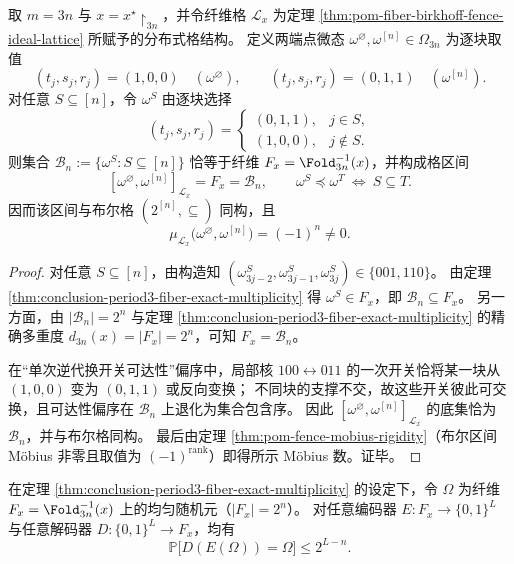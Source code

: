 \begin{proposition}\label{prop:conclusion-periodic-fiber-boolean-interval-mobius}
取 \(m=3n\) 与 \(x=x^\star\!\upharpoonright_{3n}\)，并令纤维格 \(\mathcal L_x\) 为定理 \ref{thm:pom-fiber-birkhoff-fence-ideal-lattice} 所赋予的分布式格结构。
定义两端点微态 \(\omega^{\varnothing},\omega^{[n]}\in\Omega_{3n}\) 为逐块取值
\[
(t_j,s_j,r_j)=(1,0,0)\quad(\omega^{\varnothing}),
\qquad
(t_j,s_j,r_j)=(0,1,1)\quad(\omega^{[n]}).
\]
对任意 \(S\subseteq[n]\)，令 \(\omega^{S}\) 由逐块选择
\[
(t_j,s_j,r_j)=
\begin{cases}
(0,1,1),& j\in S,\\
(1,0,0),& j\notin S.
\end{cases}
\]
则集合
\(
\mathcal B_n:=\{\omega^{S}:S\subseteq[n]\}
\)
恰等于纤维 \(F_x=\Fold_{3n}^{-1}(x)\)，并构成格区间
\[
[\omega^{\varnothing},\omega^{[n]}]_{\mathcal L_x}=F_x=\mathcal B_n,
\qquad
\omega^{S}\preceq \omega^{T}\ \Longleftrightarrow\ S\subseteq T.
\]
因而该区间与布尔格 \((2^{[n]},\subseteq)\) 同构，且
\[
\mu_{\mathcal L_x}\!\bigl(\omega^{\varnothing},\omega^{[n]}\bigr)=(-1)^n\neq 0.
\]
\end{proposition}

\begin{proof}
对任意 \(S\subseteq[n]\)，由构造知 \((\omega^S_{3j-2},\omega^S_{3j-1},\omega^S_{3j})\in\{001,110\}\)。
由定理 \ref{thm:conclusion-period3-fiber-exact-multiplicity} 得 \(\omega^S\in F_x\)，即 \(\mathcal B_n\subseteq F_x\)。
另一方面，由 \(|\mathcal B_n|=2^n\) 与定理 \ref{thm:conclusion-period3-fiber-exact-multiplicity} 的精确多重度 \(d_{3n}(x)=|F_x|=2^n\)，可知 \(F_x=\mathcal B_n\)。

在“单次逆代换开关可达性”偏序中，局部核 \(100\leftrightarrow 011\) 的一次开关恰将某一块从 \((1,0,0)\) 变为 \((0,1,1)\) 或反向变换；
不同块的支撑不交，故这些开关彼此可交换，且可达性偏序在 \(\mathcal B_n\) 上退化为集合包含序。
因此 \([\omega^{\varnothing},\omega^{[n]}]_{\mathcal L_x}\) 的底集恰为 \(\mathcal B_n\)，并与布尔格同构。
最后由定理 \ref{thm:pom-fence-mobius-rigidity}（布尔区间 Möbius 非零且取值为 \((-1)^{\mathrm{rank}}\)）即得所示 Möbius 数。证毕。
\end{proof}

\begin{proposition}[单纤维均匀分布下的微观恢复上界]\label{prop:conclusion-single-fiber-decoding-bound}
在定理 \ref{thm:conclusion-period3-fiber-exact-multiplicity} 的设定下，令 \(\Omega\) 为纤维 \(F_x=\Fold_{3n}^{-1}(x)\) 上的均匀随机元（\(|F_x|=2^n\)）。
对任意编码器 \(E:F_x\to\{0,1\}^L\) 与任意解码器 \(D:\{0,1\}^L\to F_x\)，均有
\[
\mathbb{P}\bigl[D(E(\Omega))=\Omega\bigr]\le 2^{L-n}.
\]
\end{proposition}

